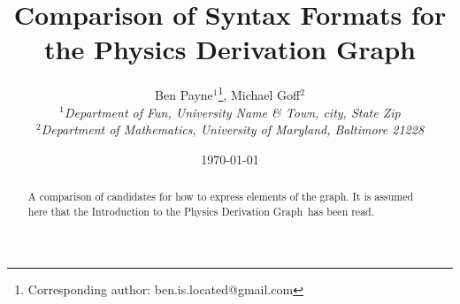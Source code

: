 \documentclass{article}
\newcommand{\pdg}{Physics Derivation Graph}
\begin{document}
\title{Comparison of Syntax Formats for the Physics Derivation Graph}

\author{Ben Payne$^{1}$\footnote{Corresponding author: ben.is.located@gmail.com}, Michael Goff$^{2}$\\
{\it $^{1}$Department of Fun, University Name \& Town, city, State Zip}\\
{\it $^{2}$Department of Mathematics, University of Maryland, Baltimore 21228}}

\date{\today}


\maketitle %

\begin{abstract}
A comparison of candidates for how to express elements of the graph. It is assumed here that the Introduction to the \pdg\ has been read. 
\end{abstract}
\end{document}
